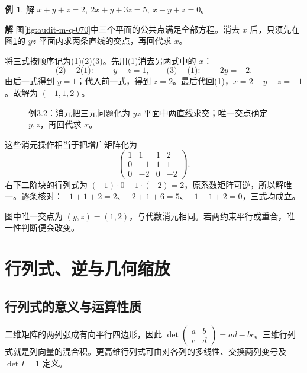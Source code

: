 \documentclass[11pt,openany,fontset=fandol]{ctexbook}
\theoremstyle{plain}\newtheorem{theorem}{定理}[chapter]\newtheorem{proposition}[theorem]{命题}
\theoremstyle{definition}\newtheorem{definition}{定义}[chapter]\newtheorem{example}{例}[chapter]
\theoremstyle{remark}\newtheorem*{remark}{说明}
\newcommand{\SolutionStart}{\par\nobreak\medskip\nobreak\noindent\textbf{解}\quad\ignorespaces}
\newenvironment{solution}{\SolutionStart}{\par\medskip}
\begin{document}
\begin{example}
解 $x+y+z=2,\ 2x+y+3z=5,\ x-y+z=0$。
\end{example}

\begin{solution}
图\ref{fig:audit-m-q-070}中三个平面的公共点满足全部方程。消去 $x$ 后，只须先在图\ref{fig:eg-3-2}的 $yz$ 平面内求两条直线的交点，再回代求 $x$。

将三式按顺序记为(1)(2)(3)。先用(1)消去另两式中的 $x$：
\[
\text{(2)}-2\text{(1)}:\quad-y+z=1,
\qquad
\text{(3)}-\text{(1)}:\quad-2y=-2.
\]
由后一式得到 $y=1$；代入前一式，得到 $z=2$。最后代回(1)，$x=2-y-z=-1$。故解为 $(-1,1,2)$。

\begin{figure}[H]\centering
{}
\caption{例3.2：消元把三元问题化为 $yz$ 平面中两直线求交；唯一交点确定 $y,z$，再回代求 $x$。}\label{fig:eg-3-2}
\end{figure}

这些消元操作相当于把增广矩阵化为
\[
\left(\begin{array}{ccc|c}1&1&1&2\\0&-1&1&1\\0&-2&0&-2\end{array}\right).
\]
右下二阶块的行列式为 $(-1)\cdot0-1\cdot(-2)=2$，原系数矩阵可逆，所以解唯一。逐条核对：$-1+1+2=2$、$-2+1+6=5$、$-1-1+2=0$，三式均成立。

图中唯一交点为 $(y,z)=(1,2)$，与代数消元相同。若两约束平行或重合，唯一性判断便会改变。
\end{solution}

\section{行列式、逆与几何缩放}
\subsection{行列式的意义与运算性质}
二维矩阵的两列张成有向平行四边形，因此 $\det\begin{pmatrix}a&b\\c&d\end{pmatrix}=ad-bc$。三维行列式就是列向量的混合积。更高维行列式可由对各列的多线性、交换两列变号及 $\det I=1$ 定义。
\end{document}

